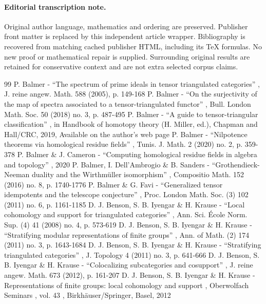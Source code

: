 \documentclass[11pt]{article}
\begin{document}
\paragraph{Editorial transcription note.}
Original author language, mathematics and ordering are preserved. Publisher front matter is replaced by this independent article wrapper. Bibliography is recovered from matching cached publisher HTML, including its TeX formulas. No new proof or mathematical repair is supplied. Surrounding original results are retained for conservative context and are not extra selected corpus claims.
\clearpage

\begin{thebibliography}{99}
 P. Balmer - “The spectrum of prime ideals in tensor triangulated categories” , J. reine angew. Math. 588 (2005), p. 149-168
 P. Balmer - “On the surjectivity of the map of spectra associated to a tensor-triangulated functor” , Bull. London Math. Soc. 50 (2018) no. 3, p. 487-495
 P. Balmer - “A guide to tensor-triangular classification” , in Handbook of homotopy theory (H. Miller, ed.), Chapman and Hall/CRC, 2019, Available on the author’s web page
 P. Balmer - “Nilpotence theorems via homological residue fields” , Tunis. J. Math. 2 (2020) no. 2, p. 359-378
 P. Balmer \& J. Cameron - “Computing homological residue fields in algebra and topology” , 2020
 P. Balmer, I. Dell’Ambrogio \& B. Sanders - “Grothendieck-Neeman duality and the Wirthmüller isomorphism” , Compositio Math. 152 (2016) no. 8, p. 1740-1776
 P. Balmer \& G. Favi - “Generalized tensor idempotents and the telescope conjecture” , Proc. London Math. Soc. (3) 102 (2011) no. 6, p. 1161-1185
 D. J. Benson, S. B. Iyengar \& H. Krause - “Local cohomology and support for triangulated categories” , Ann. Sci. École Norm. Sup. (4) 41 (2008) no. 4, p. 573-619
 D. J. Benson, S. B. Iyengar \& H. Krause - “Stratifying modular representations of finite groups” , Ann. of Math. (2) 174 (2011) no. 3, p. 1643-1684
 D. J. Benson, S. B. Iyengar \& H. Krause - “Stratifying triangulated categories” , J. Topology 4 (2011) no. 3, p. 641-666
 D. J. Benson, S. B. Iyengar \& H. Krause - “Colocalizing subcategories and cosupport” , J. reine angew. Math. 673 (2012), p. 161-207
 D. J. Benson, S. B. Iyengar \& H. Krause - Representations of finite groups: local cohomology and support , Oberwolfach Seminars , vol. 43 , Birkhäuser/Springer, Basel, 2012

\end{thebibliography}
\end{document}
